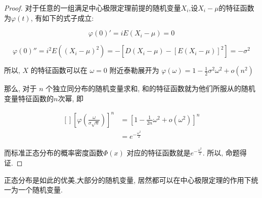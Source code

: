 		\begin{proof}
				对于任意的一组满足中心极限定理前提的随机变量$X_i$,设$X_i-\mu$的特征函数为$\varphi(t)$, 有如下的式子成立:
		
				\begin{equation}
					\varphi(0)' = i E(X_i - \mu) = 0
				\end{equation}
		
				\begin{equation}
					\varphi(0)'' = i^2 E((X_i-\mu)^2) = -[D(X_i-\mu) - [E(X_i - \mu)]^2] = -\sigma^2
				\end{equation}
		
				所以, $X$ 的特征函数可以在 $\omega = 0$ 附近泰勒展开为 $\varphi(\omega) = 1 - \frac{1}{2} \sigma^2 \omega^2 + o(n^2)$
		
				那么, 对于 $n$ 个独立同分布的随机变量求和, 和的特征函数就为他们所服从的随机变量特征函数的$n$次幂, 即 
				
				\begin{equation}
					\begin{aligned}[]						
						\left[\varphi(\frac{\omega}{\sigma \sqrt{n}})\right]^n & =  \left[1 - \frac{1}{2n} \omega^2 + o(\omega^2)\right]^n \\
						& =  e^{-\frac{\omega^2}{2}}
					\end{aligned}				
				\end{equation}
				
				而标准正态分布的概率密度函数$\Phi(x)$ 对应的特征函数就是$e^{-\frac{\omega^2}{2}}$.
				所以, 命题得证.							
		\end{proof}
		
		正态分布是如此的优美,大部分的随机变量, 居然都可以在中心极限定理的作用下统一为一个随机变量.
					